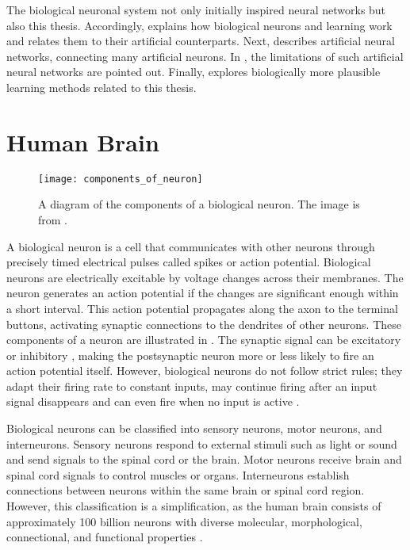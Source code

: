 The biological neuronal system not only initially inspired neural networks but also this thesis.
Accordingly,  explains how biological neurons and learning work and relates them to their artificial counterparts.
Next,   describes artificial neural networks, connecting many artificial neurons.
In , the limitations of such artificial neural networks are pointed out.
Finally,  explores biologically more plausible learning methods related to this thesis.

\section{Human Brain}
\begin{figure}[h]
    \centering
    \texttt{[image: components\_of\_neuron]}
    \caption[Diagram of the components of a biological neuron]{A diagram of the components of a biological neuron. The image is from .}
\end{figure}

A biological neuron is a cell that communicates with other neurons through precisely timed electrical pulses called spikes or action potential.
Biological neurons are electrically excitable by voltage changes across their membranes.
The neuron generates an action potential if the changes are significant enough within a short interval.
This action potential propagates along the axon to the terminal buttons, activating synaptic connections to the dendrites of other neurons.
These components of a neuron are illustrated in .
The synaptic signal can be excitatory  or inhibitory , making the postsynaptic neuron more or less likely to fire an action potential itself.
However, biological neurons do not follow strict rules; they adapt their firing rate to constant inputs, may continue firing after an input signal disappears and can even fire when no input is active .

Biological neurons can be classified into sensory neurons, motor neurons, and interneurons.
Sensory neurons respond to external stimuli such as light or sound and send signals to the spinal cord or the brain.
Motor neurons receive brain and spinal cord signals to control muscles or organs.
Interneurons establish connections between neurons within the same brain or spinal cord region.
However, this classification is a simplification, as the human brain consists of approximately 100 billion neurons  with diverse molecular, morphological, connectional, and functional properties .

